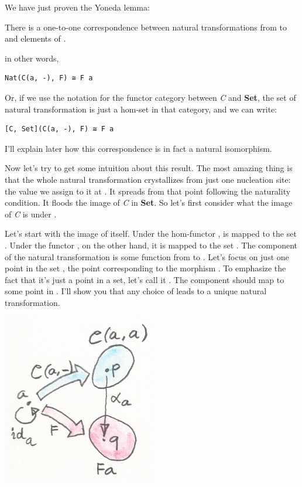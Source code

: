 We have just proven the Yoneda lemma:

There is a one-to-one correspondence between natural transformations
from  to  and elements of .

in other words,

\begin{Verbatim}[commandchars=\\\{\}]
Nat(C(a, -), F) ≅ F a
\end{Verbatim}

Or, if we use the notation \code{{[}C,\ Set{]}} for the functor
category between \emph{C} and \textbf{Set}, the set of natural
transformation is just a hom-set in that category, and we can write:

\begin{Verbatim}[commandchars=\\\{\}]
[C, Set](C(a, -), F) ≅ F a
\end{Verbatim}

I'll explain later how this correspondence is in fact a natural
isomorphism.

Now let's try to get some intuition about this result. The most amazing
thing is that the whole natural transformation crystallizes from just
one nucleation site: the value we assign to it at . It
spreads from that point following the naturality condition. It floods
the image of \emph{C} in \textbf{Set}. So let's first consider what the
image of \emph{C} is under .

Let's start with the image of  itself. Under the hom-functor
,  is mapped to the set .
Under the functor , on the other hand, it is mapped to the set
. The component of the natural transformation 
is some function from  to . Let's focus on
just one point in the set , the point corresponding to
the morphism . To emphasize the fact that it's just a point
in a set, let's call it . The component  should map
 to some point  in . I'll show you that
any choice of  leads to a unique natural transformation.

\includegraphics{images/yoneda3.png}

